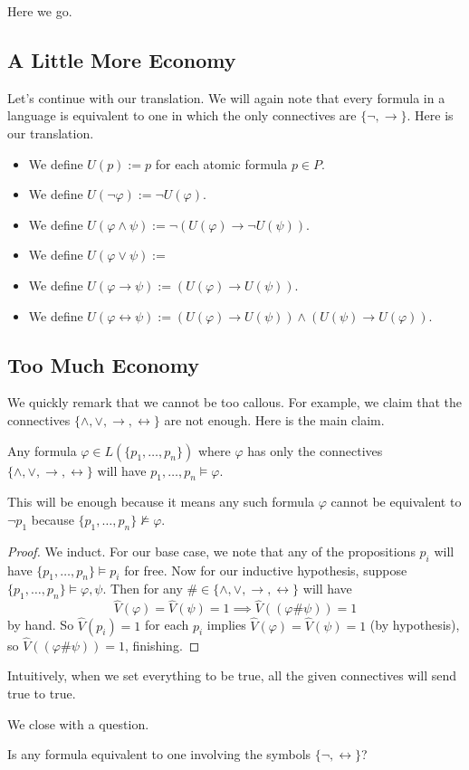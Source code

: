 
Here we go.

\subsection{A Little More Economy}
Let's continue with our translation. We will again note that every formula in a language is equivalent to one in which the only connectives are $\{\lnot,\to\}$. Here is our translation.
\begin{itemize}
	\item We define $U(p):=p$ for each atomic formula $p\in P$.
	\item We define $U(\lnot\varphi):=\lnot U(\varphi)$.
	\item We define $U(\varphi\land\psi):=\lnot(U(\varphi)\to\lnot U(\psi))$.
	\item We define $U(\varphi\lor\psi):=$
	\item We define $U(\varphi\to\psi):=(U(\varphi)\to U(\psi))$.
	\item We define $U(\varphi\leftrightarrow\psi):=(U(\varphi)\to U(\psi))\land(U(\psi)\to U(\varphi))$.
\end{itemize}

\subsection{Too Much Economy}
We quickly remark that we cannot be too callous. For example, we claim that the connectives $\{\land,\lor,\to,\leftrightarrow\}$ are not enough. Here is the main claim.
\begin{lemma}
	Any formula $\varphi\in L(\{p_1,\ldots,p_n\})$ where $\varphi$ has only the connectives $\{\land,\lor,\to,\leftrightarrow\}$ will have $p_1,\ldots,p_n\models\varphi$.
\end{lemma}
This will be enough because it means any such formula $\varphi$ cannot be equivalent to $\lnot p_1$ because $\{p_1,\ldots,p_n\}\nvDash\varphi$.
\begin{proof}
	We induct. For our base case, we note that any of the propositions $p_i$ will have $\{p_1,\ldots,p_n\}\models p_i$ for free. Now for our inductive hypothesis, suppose $\{p_1,\ldots,p_n\}\models\varphi,\psi$. Then for any $\#\in\{\land,\lor,\to,\leftrightarrow\}$ will have
	\[\hat V(\varphi)=\hat V(\psi)=1\implies\hat V((\varphi\#\psi))=1\]
	by hand. So $\hat V(p_i)=1$ for each $p_i$ implies $\hat V(\varphi)=\hat V(\psi)=1$ (by hypothesis), so $\hat V((\varphi\#\psi))=1$, finishing.
\end{proof}
\begin{remark}
	Intuitively, when we set everything to be true, all the given connectives will send true to true.
\end{remark}
We close with a question.
\begin{ques}
	Is any formula equivalent to one involving the symbols $\{\lnot,\leftrightarrow\}$?
\end{ques}

